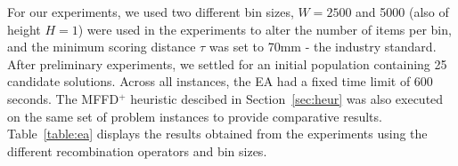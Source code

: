\documentclass[authoryear]{elsarticle}
\begin{document}
For our experiments, we used two different bin sizes, $W = 2500$ and 5000 (also of height $H=1$) were used in the experiments to alter the number of items per bin, and the minimum scoring distance $\tau$ was set to 70mm - the industry standard. After preliminary experiments, we settled for an initial population containing 25 candidate solutions. Across all instances, the EA had a fixed time limit of 600 seconds. The MFFD$^+$ heuristic descibed in Section~\ref{sec:heur} was also executed on the same set of problem instances to provide comparative results. Table~\ref{table:ea} displays the results obtained from the experiments using the different recombination operators and bin sizes.

\end{document}
